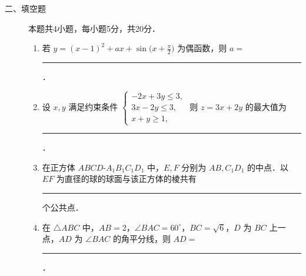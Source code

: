 \begin{description}
    \item[二、填空题] 本题共4小题，每小题5分，共20分．
    \begin{enumerate}[leftmargin=5pt]
      \addtocounter{enumi}{+12}
        \item 若 $y=(x-1)^2+ax+\sin\bigl(x+\frac{\pi}{2}\bigr)$ 为偶函数，则 $a=$ \rule[-0.3ex]{3em}{0.4pt}．
        \item 设 $x,y$ 满足约束条件 $\begin{cases}-2x+3y\leqslant3,\\3x-2y\leqslant3,\\x+y\geqslant1,\end{cases}$ 则 $z=3x+2y$ 的最大值为 \rule[-0.3ex]{3em}{0.4pt}．
        \item 在正方体 $ABCD$-$A_1B_1C_1D_1$ 中，$E,F$ 分别为 $AB,C_1D_1$ 的中点．以 $EF$ 为直径的球的球面与该正方体的棱共有 \rule[-0.3ex]{3em}{0.4pt} 个公共点．
        \item 在 $\triangle ABC$ 中，$AB=2$，$\angle BAC=60^\circ$，$BC=\sqrt{6}$，$D$ 为 $BC$ 上一点，$AD$ 为 $\angle BAC$ 的角平分线，则 $AD=$ \rule[-0.3ex]{3em}{0.4pt}．
    \end{enumerate}
\end{description}

